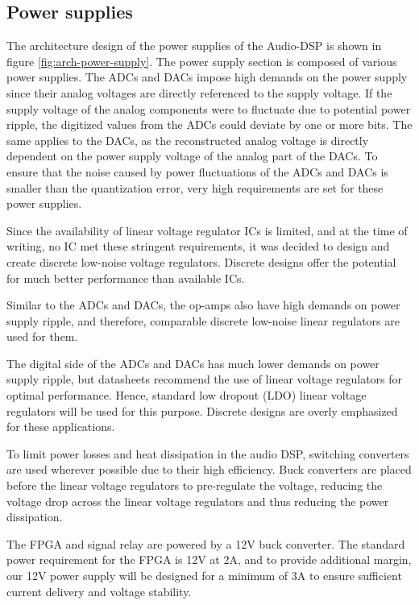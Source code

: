 \subsection{Power supplies}
The architecture design of the power supplies of the Audio-DSP is shown in figure \ref{fig:arch-power-supply}. The power supply section is composed of various power supplies. The ADCs and DACs impose high demands on the power supply since their analog voltages are directly referenced to the supply voltage. If the supply voltage of the analog components were to fluctuate due to potential power ripple, the digitized values from the ADCs could deviate by one or more bits. The same applies to the DACs, as the reconstructed analog voltage is directly dependent on the power supply voltage of the analog part of the DACs. To ensure that the noise caused by power fluctuations of the ADCs and DACs is smaller than the quantization error, very high requirements are set for these power supplies.

Since the availability of linear voltage regulator ICs is limited, and at the time of writing, no IC met these stringent requirements, it was decided to design and create discrete low-noise voltage regulators. Discrete designs offer the potential for much better performance than available ICs.

Similar to the ADCs and DACs, the op-amps also have high demands on power supply ripple, and therefore, comparable discrete low-noise linear regulators are used for them.

The digital side of the ADCs and DACs has much lower demands on power supply ripple, but datasheets recommend the use of linear voltage regulators for optimal performance. Hence, standard low dropout (LDO) linear voltage regulators will be used for this purpose. Discrete designs are overly emphasized for these applications.

To limit power losses and heat dissipation in the audio DSP, switching converters are used wherever possible due to their high efficiency. Buck converters are placed before the linear voltage regulators to pre-regulate the voltage, reducing the voltage drop across the linear voltage regulators and thus reducing the power dissipation.

The FPGA and signal relay are powered by a 12V buck converter. The standard power requirement for the FPGA is 12V at 2A, and to provide additional margin, our 12V power supply will be designed for a minimum of 3A to ensure sufficient current delivery and voltage stability.

